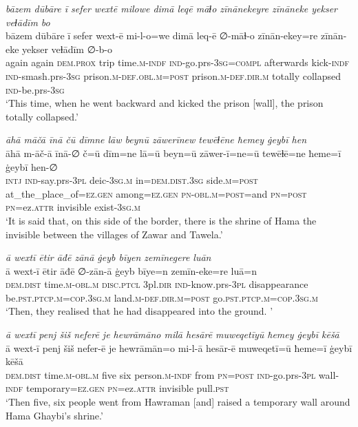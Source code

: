 \ea \label{BP.173}
\textit{bāzem dūbāre ī sefer wextē milowe dimā leqē māɫo zīnānekeyre zīnāneke yekser veɫādīm bo} \\ 
\gll bāzem dūbāre ī sefer wext-ē mi-l-o=we dimā leq-ē ∅-māɫ-o zīnān-ekey=re zīnān-eke yekser veɫādīm ∅-b-o \\ 
 again again \textsc{dem.prox} trip time\textsc{.m}\textsc{-indf} \textsc{ind-}go.prs\textsc{-3sg}\textsc{=compl} afterwards kick\textsc{-indf} \textsc{ind-}smash.prs\textsc{-3sg} prison\textsc{.m}\textsc{-def}\textsc{.obl}\textsc{.m}\textsc{=\textsc{post}} prison\textsc{.m}\textsc{-def}\textsc{.dir}\textsc{.m} totally collapsed \textsc{ind-}be.prs\textsc{-3sg} \\ 
\glt `This time, when he went backward and kicked the prison [wall], the prison totally collapsed.'
\z 
 
\ea \label{BP.178}
\textit{āhā māčā īnā čū dīmne lāw beynū zāwerīnew tewēɫēne ħemey ġeybī hen} \\ 
\gll āhā m-āč-ā īnā-∅ č=ū dīm=ne lā=ū beyn=ū zāwer-ī=ne=ū tewēɫē=ne ħeme=ī ġeybī hen-∅ \\ 
 \textsc{intj} \textsc{ind-}say.prs\textsc{-3pl} deic\textsc{-3sg}\textsc{.m} in=\textsc{dem.dist}\textsc{.3sg} side\textsc{.m}\textsc{=\textsc{post}} at\_the\_place\_of\textsc{=ez.gen} among\textsc{=ez.gen} \textsc{pn}\textsc{-obl}\textsc{.m}\textsc{=\textsc{post}}=and \textsc{pn}\textsc{=\textsc{post}} \textsc{pn}=ez.\textsc{attr} invisible exist\textsc{-3sg}\textsc{.m} \\ 
\glt `It is said that, on this side of the border, there is the shrine of Hama the invisible between the villages of Zawar and Tawela.'
\z 
 
\ea \label{BP.197}
\textit{ā wextī ētir āđē zānā ġeyb bīyen zemīnegere luān} \\ 
\gll ā wext-ī ētir āđē ∅-zān-ā ġeyb bīye=n zemīn-eke=re luā=n \\ 
 \textsc{dem.dist} time\textsc{.m}\textsc{-obl}\textsc{.m} \textsc{disc.ptcl} 3pl\textsc{.dir} \textsc{ind-}know.prs\textsc{-3pl} disappearance be\textsc{.pst}\textsc{.ptcp}\textsc{.m}\textsc{=cop}\textsc{.3sg}\textsc{.m} land\textsc{.m}\textsc{-def}\textsc{.dir}\textsc{.m}\textsc{=\textsc{post}} go\textsc{.pst}\textsc{.ptcp}\textsc{.m}\textsc{=cop}\textsc{.3sg}\textsc{.m} \\ 
\glt `Then, they realised that he had disappeared into the ground. '
\z 
 
\ea \label{BP.203}
\textit{ā wextī penj šiš neferē je hewrāmāno milā hesārē muweqetīyū ħemey ġeybī kēšā} \\ 
\gll ā wext-ī penj šiš nefer-ē je hewrāmān=o mi-l-ā hesār-ē muweqetī=ū ħeme=ī ġeybī kēšā \\ 
 \textsc{dem.dist} time\textsc{.m}\textsc{-obl}\textsc{.m} five six person\textsc{.m}\textsc{-indf} from \textsc{pn}\textsc{=\textsc{post}} \textsc{ind-}go.prs\textsc{-3pl} wall\textsc{-indf} temporary\textsc{=ez.gen} \textsc{pn}=ez.\textsc{attr} invisible pull\textsc{.pst} \\ 
\glt `Then five, six people went from Hawraman [and] raised a temporary wall around Hama Ghaybi’s shrine.'
\z 
 
